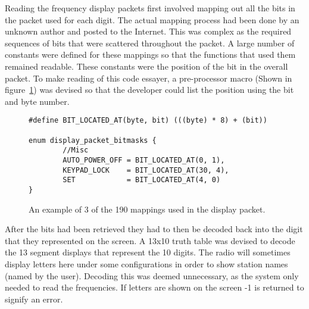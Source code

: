 Reading the frequency display packets first involved mapping out all the bits in the packet used for each digit. The actual mapping process had been done by an unknown author and posted to the Internet\cite{8800r_reverse}. This was complex as the required sequences of bits that were scattered throughout the packet. A large number of constants were defined for these mappings so that the functions that used them remained readable. These constants were the position of the bit in the overall packet. To make reading of this code essayer, a pre-processor macro (Shown in figure~\ref{fig:packet_mapping}) was devised so that the developer could list the position using the bit and byte number.

\begin{figure}
\centering
\begin{verbatim}
#define BIT_LOCATED_AT(byte, bit) (((byte) * 8) + (bit))

enum display_packet_bitmasks {
        //Misc
        AUTO_POWER_OFF = BIT_LOCATED_AT(0, 1),
        KEYPAD_LOCK    = BIT_LOCATED_AT(30, 4),
        SET            = BIT_LOCATED_AT(4, 0)
}
\end{verbatim}
\caption[Packet mapping]{An example of 3 of the 190 mappings used in the display packet.}
\label{fig:packet_mapping}
\end{figure}

After the bits had been retrieved they had to then be decoded back into the digit that they represented on the screen. A 13x10 truth table was devised to decode the 13 segment displays that represent the 10 digits. The radio will sometimes display letters here under some configurations in order to show station names (named by the user). Decoding this was deemed unnecessary, as the system only needed to read the frequencies. If letters are shown on the screen -1 is returned to signify an error.


